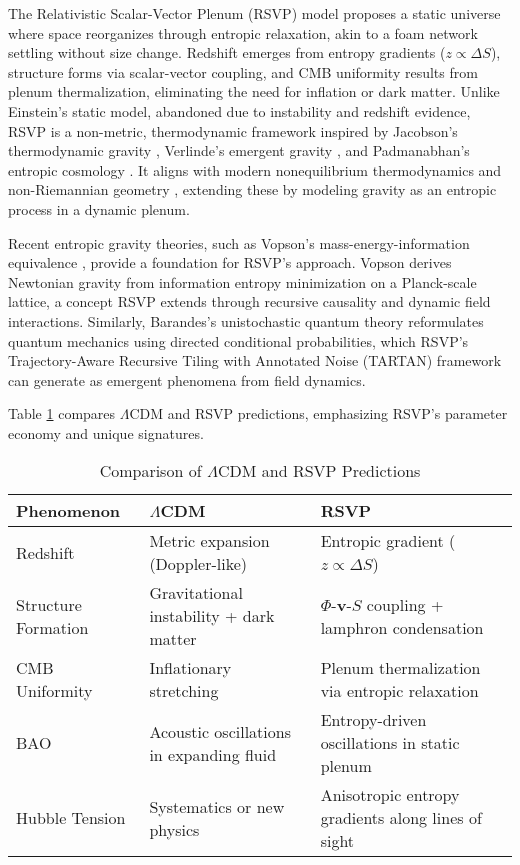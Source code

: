 \documentclass[11pt]{article}
\theoremstyle{plain}
\theoremstyle{definition}
\begin{document}
The Relativistic Scalar-Vector Plenum (RSVP) model proposes a static universe where space reorganizes through entropic relaxation, akin to a foam network settling without size change. Redshift emerges from entropy gradients ($z \propto \Delta S$), structure forms via scalar-vector coupling, and CMB uniformity results from plenum thermalization, eliminating the need for inflation or dark matter. Unlike Einstein’s static model, abandoned due to instability and redshift evidence, RSVP is a non-metric, thermodynamic framework inspired by Jacobson’s thermodynamic gravity \citep{Jacobson1995}, Verlinde’s emergent gravity \citep{Verlinde2011}, and Padmanabhan’s entropic cosmology \citep{Padmanabhan2015}. It aligns with modern nonequilibrium thermodynamics and non-Riemannian geometry \citep{Shao2023}, extending these by modeling gravity as an entropic process in a dynamic plenum.

Recent entropic gravity theories, such as Vopson’s mass-energy-information equivalence \citep{Vopson2022}, provide a foundation for RSVP’s approach. Vopson derives Newtonian gravity from information entropy minimization on a Planck-scale lattice, a concept RSVP extends through recursive causality and dynamic field interactions. Similarly, Barandes’s unistochastic quantum theory \citep{Barandes2024} reformulates quantum mechanics using directed conditional probabilities, which RSVP’s Trajectory-Aware Recursive Tiling with Annotated Noise (TARTAN) framework can generate as emergent phenomena from field dynamics.

Table \ref{tab:comparison} compares $\Lambda$CDM and RSVP predictions, emphasizing RSVP’s parameter economy and unique signatures.

\begin{table}[ht]
\centering
\caption{Comparison of $\Lambda$CDM and RSVP Predictions}
\label{tab:comparison}
\begin{tabular}{p{}p{}p{}}
\toprule
\textbf{Phenomenon} & \textbf{$\Lambda$CDM} & \textbf{RSVP} \\
\midrule
Redshift & Metric expansion (Doppler-like) & Entropic gradient ($z \propto \Delta S$) \\
Structure Formation & Gravitational instability + dark matter & $\Phi$-$\bm{v}$-$S$ coupling + lamphron condensation \\
CMB Uniformity & Inflationary stretching & Plenum thermalization via entropic relaxation \\
BAO & Acoustic oscillations in expanding fluid & Entropy-driven oscillations in static plenum \\
Hubble Tension & Systematics or new physics & Anisotropic entropy gradients along lines of sight \\
\bottomrule
\end{tabular}
\end{table}
\end{document}
